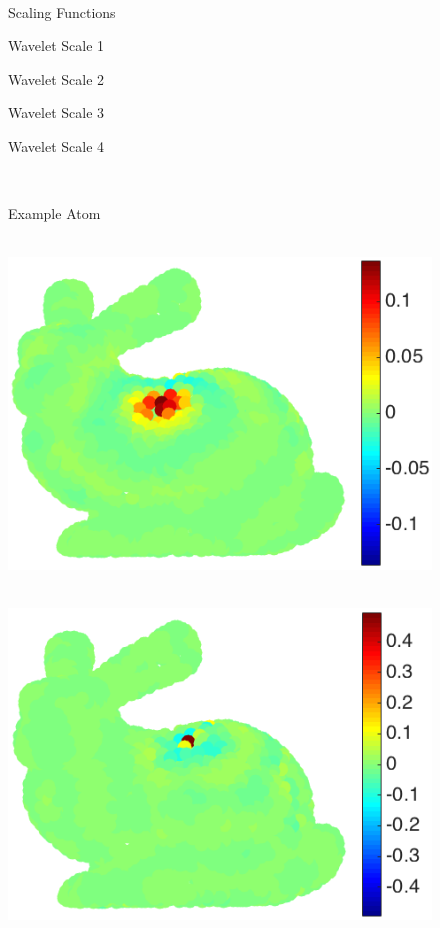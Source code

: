 \documentclass[journal, 10pt]{IEEEtran}
\begin{document}
\begin{figure}[bth] 
\begin{minipage}[m]{0.16\linewidth}
~
\end{minipage}
\begin{minipage}[m]{0.16\linewidth}
\centerline{\small{Scaling Functions}}
\end{minipage}
\hspace{.01\linewidth}
\begin{minipage}[m]{0.16\linewidth}
\centerline{\small{Wavelet Scale 1~~~~}}
\end{minipage}
\begin{minipage}[m]{0.16\linewidth}
\centerline{\small{Wavelet Scale 2~~~~}}\end{minipage}
\begin{minipage}[m]{0.16\linewidth}
\centerline{\small{Wavelet Scale 3~~~~}}\end{minipage}
\begin{minipage}[m]{0.16\linewidth}
\centerline{\small{Wavelet Scale 4~~~~~}}\end{minipage} \\
\begin{minipage}[m]{0.16\linewidth}
\centerline{\small{Example Atom}}
\end{minipage}
\begin{minipage}[m]{0.16\linewidth}
\centerline{~~\includegraphics[width=.85\linewidth]{fig_bunny_atom_scalinga}}
\end{minipage}
\begin{minipage}[m]{0.16\linewidth}
\centerline{~~\includegraphics[width=.85\linewidth]{fig_bunny_atom_wav1a}}

\end{minipage}
\end{figure}
\end{document}
